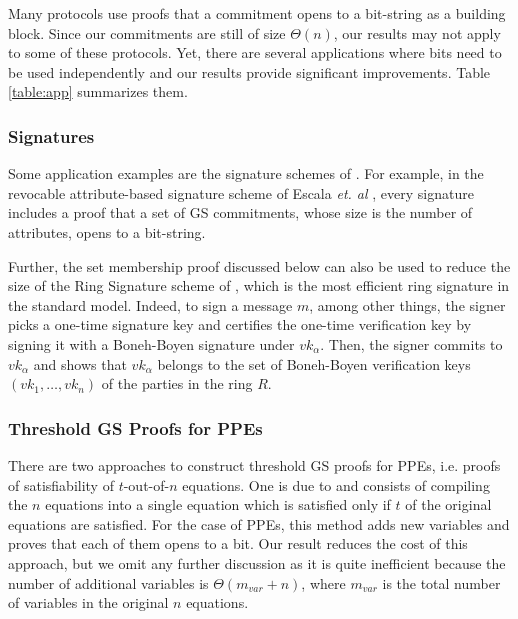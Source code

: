 Many protocols use proofs that a commitment opens to a bit-string as a 
  building block. 
Since our commitments are still of size $\Theta(n)$,
  our results may not apply to some of these protocols. 
Yet, there are several applications where 
  bits need to be used independently and our results provide 
  significant improvements.
Table \ref{table:app} summarizes them.
 
\subsubsection{Signatures} Some application examples are the signature schemes of  \cite{PKC:BFPV11,SCN:BlaPoiVer12,RSA:Camacho13,AFRICACRYPT:EscHerMor11}. For example, in the revocable attribute-based signature scheme of Escala \textit{et. al} \cite{AFRICACRYPT:EscHerMor11}, every signature includes a proof that a set of GS commitments, whose size is the number of attributes, opens to a bit-string. 

Further, the set membership proof discussed below can also be used to reduce the size of the Ring Signature scheme of  \cite{ICALP:ChaGroSah07}, which is the most efficient ring signature in the standard model. Indeed, to sign a message $m$, among other things, the signer picks a one-time signature key and certifies the one-time verification key by signing it with a Boneh-Boyen signature under $vk_\alpha$. Then, the signer commits to $vk_\alpha$ and shows that $vk_\alpha$ belongs to the set of Boneh-Boyen verification keys $(vk_1,\ldots,vk_n)$ of the parties in the ring $R$. 



\subsubsection{Threshold GS Proofs for PPEs} There are two approaches to construct threshold GS proofs for PPEs, i.e. proofs of satisfiability of $t$-out-of-$n$ equations. One is due to \cite{AC:Groth06} and consists of compiling the $n$ equations into a single equation which is satisfied only if $t$ of the original equations are satisfied. For the case of PPEs, this method adds new variables and proves that each of them opens to a bit.  Our result reduces the cost of this approach, but we omit any further discussion as it is quite inefficient because the number of additional variables is $\Theta(m_{var}+n)$, where $m_{var}$ is the total number of variables in the original $n$ equations.

